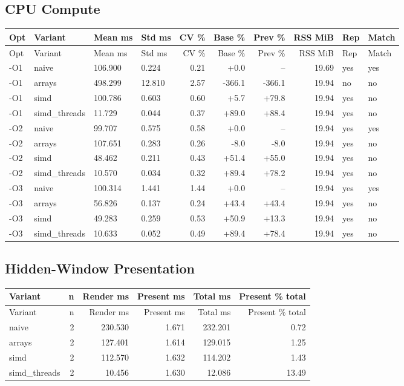\documentclass[11pt]{article}
\begin{document}
\subsection*{CPU Compute}
\begin{longtable}{llllrrrrll}
Opt & Variant & Mean ms & Std ms & CV \% & Base \% & Prev \% & RSS MiB & Rep & Match \\ \hline
\endfirsthead
Opt & Variant & Mean ms & Std ms & CV \% & Base \% & Prev \% & RSS MiB & Rep & Match \\ \hline
\endhead
-O1 & naive & 106.900 & 0.224 & 0.21 & +0.0 & -- & 19.69 & yes & yes \\
-O1 & arrays & 498.299 & 12.810 & 2.57 & -366.1 & -366.1 & 19.94 & no & no \\
-O1 & simd & 100.786 & 0.603 & 0.60 & +5.7 & +79.8 & 19.94 & yes & no \\
-O1 & simd\_threads & 11.729 & 0.044 & 0.37 & +89.0 & +88.4 & 19.94 & yes & no \\
-O2 & naive & 99.707 & 0.575 & 0.58 & +0.0 & -- & 19.94 & yes & yes \\
-O2 & arrays & 107.651 & 0.283 & 0.26 & -8.0 & -8.0 & 19.94 & yes & no \\
-O2 & simd & 48.462 & 0.211 & 0.43 & +51.4 & +55.0 & 19.94 & yes & no \\
-O2 & simd\_threads & 10.570 & 0.034 & 0.32 & +89.4 & +78.2 & 19.94 & yes & no \\
-O3 & naive & 100.314 & 1.441 & 1.44 & +0.0 & -- & 19.94 & yes & yes \\
-O3 & arrays & 56.826 & 0.137 & 0.24 & +43.4 & +43.4 & 19.94 & yes & no \\
-O3 & simd & 49.283 & 0.259 & 0.53 & +50.9 & +13.3 & 19.94 & yes & no \\
-O3 & simd\_threads & 10.633 & 0.052 & 0.49 & +89.4 & +78.4 & 19.94 & yes & no \\
\end{longtable}

\subsection*{Hidden-Window Presentation}
\begin{longtable}{lrrrrr}
Variant & n & Render ms & Present ms & Total ms & Present \% total \\ \hline
\endfirsthead
Variant & n & Render ms & Present ms & Total ms & Present \% total \\ \hline
\endhead
naive & 2 & 230.530 & 1.671 & 232.201 & 0.72 \\
arrays & 2 & 127.401 & 1.614 & 129.015 & 1.25 \\
simd & 2 & 112.570 & 1.632 & 114.202 & 1.43 \\
simd\_threads & 2 & 10.456 & 1.630 & 12.086 & 13.49 \\
\end{longtable}
\end{document}
